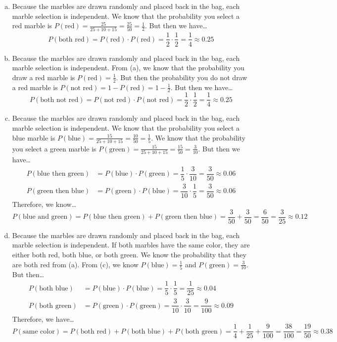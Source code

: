 \documentclass[11pt,letterpaper]{article}
\begin{document}
\sol 
\begin{enumerate}[(a)]
\item Because the marbles are drawn randomly and placed back in the bag, each marble selection is independent. We know that the probability you select a red marble is $P(\text{red})= \frac{25}{25 + 10 + 15}= \frac{25}{50}= \frac{1}{2}$. But then we have\dots
	\[
	P(\text{both red})= P(\text{red}) \cdot P(\text{red})= \dfrac{1}{2} \cdot \dfrac{1}{2}= \dfrac{1}{4} \approx 0.25
	\]

\item Because the marbles are drawn randomly and placed back in the bag, each marble selection is independent. From (a), we know that the probability you draw a red marble is $P(\text{red})= \frac{1}{2}$. But then the probability you do not draw a red marble is $P(\text{not red})= 1 - P(\text{red})= 1 - \frac{1}{2}$. But then we have\dots
	\[
	P(\text{both not red})= P(\text{not red}) \cdot P(\text{not red})= \dfrac{1}{2} \cdot \dfrac{1}{2}= \dfrac{1}{4} \approx 0.25
	\]

\item Because the marbles are drawn randomly and placed back in the bag, each marble selection is independent. We know that the probability you select a blue marble is $P(\text{blue})= \frac{15}{25 + 10 + 15}= \frac{10}{50}= \frac{1}{5}$. We know that the probability you select a green marble is $P(\text{green})= \frac{15}{25 + 10 + 15}= \frac{15}{50}= \frac{3}{10}$. But then we have\dots
	\[
	\begin{aligned}
	P(\text{blue then green})&= P(\text{blue}) \cdot P(\text{green})= \dfrac{1}{5} \cdot \dfrac{3}{10}= \dfrac{3}{50} \approx 0.06 \\[0.3cm]
	P(\text{green then blue})&= P(\text{green}) \cdot P(\text{blue})= \dfrac{3}{10} \cdot \dfrac{1}{5}= \dfrac{3}{50} \approx 0.06
	\end{aligned}
	\]
Therefore, we know\dots
	\[
	P(\text{blue and green})= P(\text{blue then green}) + P(\text{green then blue})= \dfrac{3}{50} + \dfrac{3}{50}= \dfrac{6}{50}= \dfrac{3}{25} \approx 0.12
	\]

\item Because the marbles are drawn randomly and placed back in the bag, each marble selection is independent. If both marbles have the same color, they are either both red, both blue, or both green. We know the probability that they are both red from (a). From (c), we know $P(\text{blue})= \frac{1}{5}$ and $P(\text{green})= \frac{3}{10}$. But then\dots
	\[
	\begin{aligned}
	P(\text{both blue})&= P(\text{blue}) \cdot P(\text{blue})= \dfrac{1}{5} \cdot \dfrac{1}{5}= \dfrac{1}{25} \approx 0.04 \\[0.3cm]
	P(\text{both green})&= P(\text{green}) \cdot P(\text{green})= \dfrac{3}{10} \cdot \dfrac{3}{10}= \dfrac{9}{100} \approx 0.09
	\end{aligned}
	\]
Therefore, we have\dots
	\[
	P(\text{same color})= P(\text{both red}) + P(\text{both blue}) + P(\text{both green})= \dfrac{1}{4} + \dfrac{1}{25} + \dfrac{9}{100}= \dfrac{38}{100}= \dfrac{19}{50} \approx 0.38
	\]
\end{enumerate}
\end{document}
